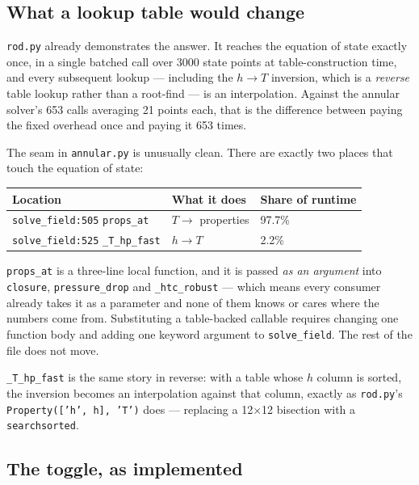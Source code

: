 \documentclass[11pt]{article}
\newcommand{\code}[1]{\texttt{#1}}
\begin{document}
\subsection{What a lookup table would change}

\code{rod.py} already demonstrates the answer. It reaches the equation of state exactly
once, in a single batched call over 3000 state points at table-construction time, and
every subsequent lookup --- including the $h \to T$ inversion, which is a \emph{reverse}
table lookup rather than a root-find --- is an interpolation. Against the annular
solver's 653 calls averaging 21 points each, that is the difference between paying the
fixed overhead once and paying it 653 times.

The seam in \code{annular.py} is unusually clean. There are exactly two places that touch
the equation of state:

\begin{center}
\begin{tabular}{llp{6.0cm}}
\toprule
Location & What it does & Share of runtime \\
\midrule
\code{solve\_field:505} \code{props\_at} & $T \to$ properties & 97.7\% \\
\code{solve\_field:525} \code{\_T\_hp\_fast} & $h \to T$ & 2.2\% \\
\bottomrule
\end{tabular}
\end{center}

\code{props\_at} is a three-line local function, and it is passed \emph{as an argument}
into \code{closure}, \code{pressure\_drop} and \code{\_htc\_robust} --- which means every
consumer already takes it as a parameter and none of them knows or cares where the numbers
come from. Substituting a table-backed callable requires changing one function body and
adding one keyword argument to \code{solve\_field}. The rest of the file does not move.

\code{\_T\_hp\_fast} is the same story in reverse: with a table whose $h$ column is sorted,
the inversion becomes an interpolation against that column, exactly as
\code{rod.py}'s \code{Property(['h', h], 'T')} does --- replacing a 12$\times$12 bisection
with a \code{searchsorted}.

\subsection{The toggle, as implemented}
\end{document}
